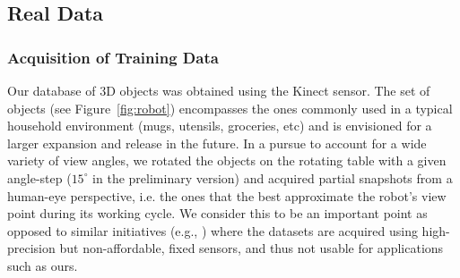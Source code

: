 \documentclass[conference]{sty/IEEEtran}
\begin{document}
\subsection{Real Data}
\subsubsection{Acquisition of Training Data}
Our database of 3D objects was obtained using the Kinect sensor.
The set of objects (see Figure~\ref{fig:robot}) encompasses the ones commonly used
in a typical household environment (mugs, utensils, groceries, etc) and is envisioned for a
larger expansion and release in the future.  In a pursue to account for a wide variety
of view angles, we rotated the objects on the rotating table with a given
angle-step ($15^\circ$ in the preliminary version) and acquired partial
snapshots from a human-eye perspective, i.e. the ones that the best
approximate the robot's view point during its working cycle.  We consider
this to be an important point as opposed to similar initiatives (e.g.,
\cite{kit}) where the datasets are acquired using high-precision but
non-affordable, fixed sensors, and thus not usable for applications such as ours.

\end{document}
